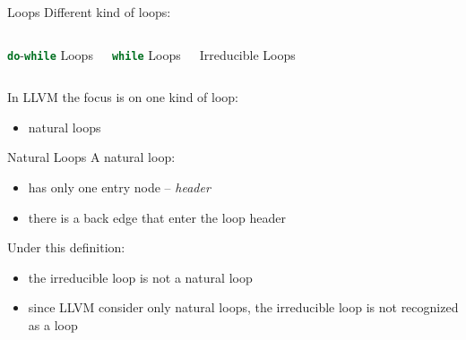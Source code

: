 \documentclass[10pt,mathserif]{beamer}
\newcommand{\cinline}[1]{\lstinline[language=C]!#1!}
\begin{document}
\begin{frame}{Loops}
Different kind of loops:

\begin{columns}[t]
\begin{block}{\cinline{do}-\cinline{while} Loops}
\centering

\end{block}

\begin{block}{\cinline{while} Loops}
\centering

\end{block}

\begin{block}{Irreducible Loops}
\centering

\end{block}
\end{columns}

\bigskip
In LLVM the focus is on one kind of loop:

\begin{itemize}
\item natural loops
\end{itemize}
\end{frame}

\begin{frame}{Natural Loops}
A natural loop:

\begin{itemize}
\item has only one entry node -- \emph{header}
\item there is a back edge that enter the loop header
\end{itemize}

Under this definition:

\begin{itemize}
\item the irreducible loop is not a natural loop
\item since LLVM consider only natural loops, the irreducible loop \alert{is not
      recognized} as a loop
\end{itemize}
\end{frame}
\end{document}
